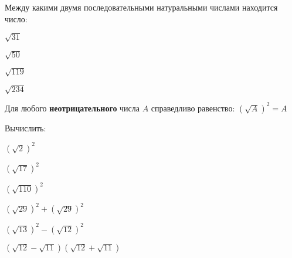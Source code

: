 \begin{class}[number=1]
\begin{listofex}[resume]
\begin{enumcols}[itemcolumns=3]
		\end{enumcols}
		\item Между какими двумя последовательными натуральными числами находится число:
		\begin{enumcols}[itemcolumns=4]
			\item \( \sqrt{31} \)
			\item \( \sqrt{50} \)
			\item \( \sqrt{119} \)
			\item \( \sqrt{234} \)
		\end{enumcols}
	\end{listofex}
	\begin{definit}
		Для любого \textbf{неотрицательного} числа \( A \) справедливо равенство: \( \left( \sqrt{A} \right)^2=A \)
	\end{definit}
	\begin{listofex}[resume]
		\item Вычислить:
		\begin{enumcols}[itemcolumns=3]
			\item \( (\sqrt{2})^2 \)
			\item \( (\sqrt{17})^2 \)
			\item \( (\sqrt{110})^2 \)
			\item \( (\sqrt{29})^2+(\sqrt{29})^2 \)
			\item \( (\sqrt{13})^2-(\sqrt{12})^2 \)
			\item \( (\sqrt{12}-\sqrt{11})(\sqrt{12}+\sqrt{11}) \)

\end{enumcols}
\end{listofex}
\end{class}
